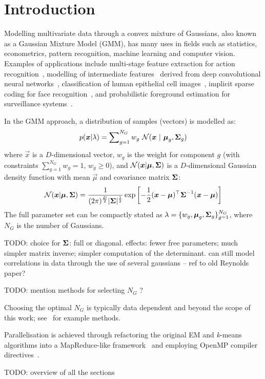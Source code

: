 \section{Introduction}

Modelling multivariate data through a convex mixture of Gaussians, also known as a Gaussian Mixture Model (GMM),
has many uses in fields such as statistics, econometrics, pattern recognition, machine learning and computer vision.
Examples of applications include
multi-stage feature extraction for action recognition~\cite{Carvajal_2016a},
modelling of intermediate features~\cite{Ge_ICIP_2015} derived from deep convolutional neural networks~\cite{Ge_2016,LeCun_Nature_2015},
classification of human epithelial cell images~\cite{Wiliem_PR_2014},
implicit sparse coding for face recognition~\cite{Wong_2014},
and probabilistic foreground estimation for surveillance systems~\cite{Reddy_2013}.

In the GMM approach, a distribution of samples (vectors) is modelled as:
%
\begin{equation}
  p({\boldsymbol{x}} | \lambda) = \sum\nolimits_{g=1}^{N_G} w_g ~ {{\mathcal{N}}}( {\boldsymbol{x}} ~|~ {\boldsymbol{\mu}}_g, {\boldsymbol{\Sigma}}_g )
  \label{eqn:gmm_prob}
\end{equation}%
%
where $\Vec{x}$ is a $D$-dimensional vector,
$w_g$ is the weight for component $g$ (with constraints $\sum\nolimits_{g=1}^{N_G} w_g = 1$, $w_g \geq 0$),
and
${{\mathcal{N}}}( {\boldsymbol{x}} | {\boldsymbol{\mu}}, {\boldsymbol{\Sigma}})$ is a $D$-dimensional Gaussian density function with mean $\Vec{\mu}$ and covariance matrix ${\boldsymbol{\Sigma}}$:
%
\begin{equation}
  {{\mathcal{N}}}( {\boldsymbol{x}} | {\boldsymbol{\mu}}, {\boldsymbol{\Sigma}} )  = 
  \frac{1}{ (2\pi)^{\frac{D}{2}} | {\boldsymbol{\Sigma}}|^{\frac{1}{2}} }
  \exp \left[ -\frac{1}{2} ({\boldsymbol{x}}-{\boldsymbol{\mu}})^\top {\boldsymbol{\Sigma}}^{-1} ({\boldsymbol{x}}-{\boldsymbol{\mu}}) \right]
  \label{eqn:gaussian}
\end{equation}%
%
The full parameter set can be compactly stated as $\lambda = \{ w_g, {\boldsymbol{\mu}}_g, {\boldsymbol{\Sigma}}_g \}_{g=1}^{N_G}$,
where $N_G$ is the number of Gaussians.



TODO: choice for ${\boldsymbol{\Sigma}}$: full or diagonal.
effects: fewer free parameters; much simpler matrix inverse; simpler computation of the determinant.
can still model correlations in data through the use of several gaussians -- ref to old Reynolds paper?

TODO: mention methods for selecting  $N_G$ ?  

Choosing the optimal $N_G$ is typically data dependent and beyond the scope of this work; see~\cite{Hamerly_2003,Pelleg_2000} for example methods.

Parallelisation is achieved through refactoring the original EM and {\it k}-means algorithms
into a MapReduce-like framework~\cite{MapReduce_2004} and employing OpenMP compiler directives~\cite{OpenMP_2007}.

TODO: overview of all the sections

